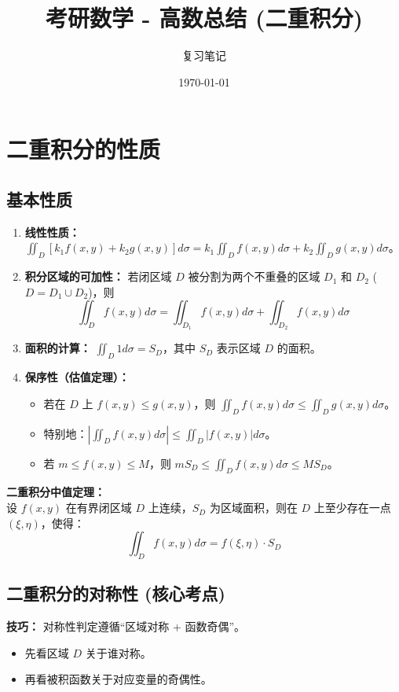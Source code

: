 \documentclass[a4paper,12pt]{ctexart}
\title{\textbf{考研数学 - 高数总结 (二重积分)}}
\author{复习笔记}
\date{\today}
\newenvironment{purplebox}
  {\begin{tcolorbox}[colback=white, colframe=boxpurple, boxrule=1pt, sharp corners, title=\textbf{定义/定理}]}
  {\end{tcolorbox}}
\newenvironment{rednote}
  {\begin{tcolorbox}[colback=notepurple, colframe=highlightred, boxrule=1pt, title=\textbf{易错点/技巧}]}
  {\end{tcolorbox}}
\begin{document}
\maketitle
\tableofcontents
\newpage

\section{二重积分的性质}

\subsection{基本性质}
\begin{enumerate}
    \item \textbf{线性性质：} $\iint_D [k_1 f(x,y) + k_2 g(x,y)] d\sigma = k_1 \iint_D f(x,y) d\sigma + k_2 \iint_D g(x,y) d\sigma$。
    \item \textbf{积分区域的可加性：} 若闭区域 $D$ 被分割为两个不重叠的区域 $D_1$ 和 $D_2$ ($D = D_1 \cup D_2$)，则
    \[ \iint_D f(x,y) d\sigma = \iint_{D_1} f(x,y) d\sigma + \iint_{D_2} f(x,y) d\sigma \]
    \item \textbf{面积的计算：} $\iint_D 1 d\sigma = S_D$，其中 $S_D$ 表示区域 $D$ 的面积。
    \item \textbf{保序性（估值定理）：} 
    \begin{itemize}
        \item 若在 $D$ 上 $f(x,y) \le g(x,y)$，则 $\iint_D f(x,y) d\sigma \le \iint_D g(x,y) d\sigma$。
        \item 特别地：$|\iint_D f(x,y) d\sigma| \le \iint_D |f(x,y)| d\sigma$。
        \item 若 $m \le f(x,y) \le M$，则 $m S_D \le \iint_D f(x,y) d\sigma \le M S_D$。
    \end{itemize}
\end{enumerate}

\begin{purplebox}
    \textbf{二重积分中值定理：} \\
    设 $f(x,y)$ 在有界闭区域 $D$ 上连续，$S_D$ 为区域面积，则在 $D$ 上至少存在一点 $(\xi, \eta)$，使得：
    \[ \iint_D f(x,y) d\sigma = f(\xi, \eta) \cdot S_D \]
\end{purplebox}

\subsection{二重积分的对称性 (核心考点)}

\begin{rednote}
    \textbf{技巧：} 对称性判定遵循“区域对称 + 函数奇偶”。
    \begin{itemize}
        \item 先看区域 $D$ 关于谁对称。
        \item 再看被积函数关于对应变量的奇偶性。
    \end{itemize}
\end{rednote}
\end{document}
